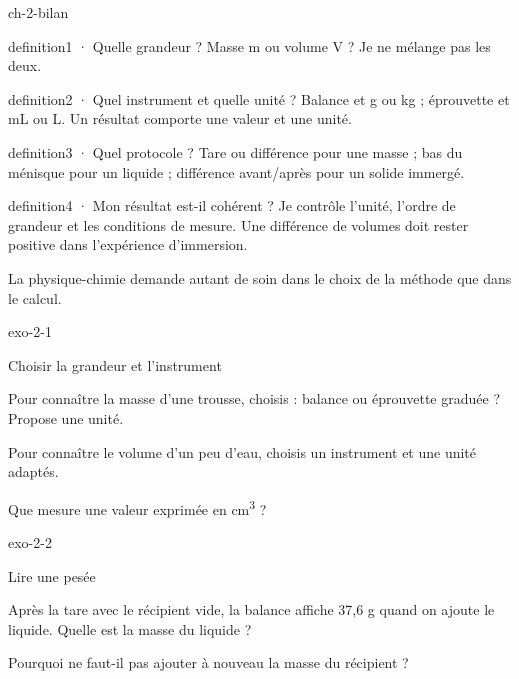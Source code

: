\documentclass[12pt,twoside,openany]{book}
\begin{document}
\begin{pcFiche}{ch-2-bilan}
\begin{pcEncadre}{definition}{1 · Quelle grandeur ?}
Masse m ou volume V ? Je ne mélange pas les deux.\par
\end{pcEncadre}
\begin{pcEncadre}{definition}{2 · Quel instrument et quelle unité ?}
Balance et g ou kg ; éprouvette et mL ou L. Un résultat comporte une valeur et une unité.\par
\end{pcEncadre}
\begin{pcEncadre}{definition}{3 · Quel protocole ?}
Tare ou différence pour une masse ; bas du ménisque pour un liquide ; différence avant/après pour un solide immergé.\par
\end{pcEncadre}
\begin{pcEncadre}{definition}{4 · Mon résultat est-il cohérent ?}
Je contrôle l’unité, l’ordre de grandeur et les conditions de mesure. Une différence de volumes doit rester positive dans l’expérience d’immersion.\par
\end{pcEncadre}
La physique-chimie demande autant de soin dans le choix de la méthode que dans le calcul.\par
\end{pcFiche}
\clearpage{}
\begin{blocLivre}{exo-2-1}
\begin{exercice}[1]{Choisir la grandeur et l’instrument}
\begin{questions}
\item Pour connaître la masse d’une trousse, choisis : balance ou éprouvette graduée ? Propose une unité.
\item Pour connaître le volume d’un peu d’eau, choisis un instrument et une unité adaptés.
\item Que mesure une valeur exprimée en cm\textsuperscript{3} ?
\end{questions}
\end{exercice}\end{blocLivre}
\begin{blocLivre}{exo-2-2}
\begin{exercice}[1]{Lire une pesée}
\begin{questions}
\item Après la tare avec le récipient vide, la balance affiche 37,6 g quand on ajoute le liquide. Quelle est la masse du liquide ?
\item Pourquoi ne faut-il pas ajouter à nouveau la masse du récipient ?
\end{questions}
\end{exercice}\end{blocLivre}
\end{document}
